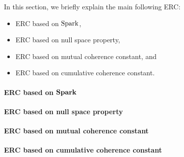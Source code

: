 In this section, we briefly explain the main following ERC:
\begin{itemize}
\item ERC based on $\mathrm{Spark}$,
\item ERC based on null space property,
\item ERC based on mutual coherence constant, and
\item ERC based on cumulative coherence constant.
\end{itemize}
\newpage
\paragraph{ERC based on $\boldsymbol{\mathrm{Spark}}$}

\newpage
\paragraph{ERC based on null space property}
\label{txt:NSP} 

\newpage
\paragraph{ERC based on mutual coherence constant}
\label{sec:Sparsity-ERC-MIC} 

\newpage
\paragraph{ERC based on cumulative coherence constant}
